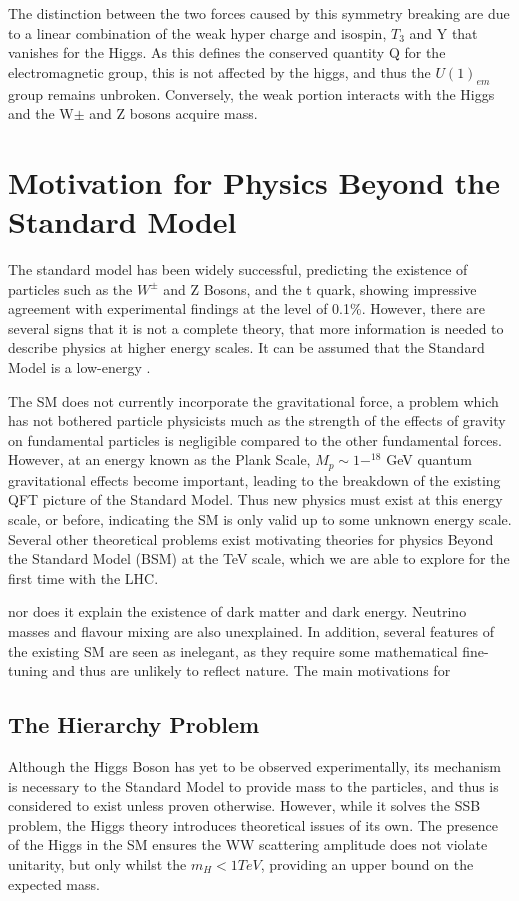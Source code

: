 The distinction between the two forces caused by this symmetry breaking are due to a linear combination of the weak hyper charge and isospin, $T_{3}$ and Y that vanishes for the Higgs. As this defines the conserved quantity Q for the electromagnetic group, this is not affected by the higgs, and thus the $U(1)_{em}$ group remains unbroken. Conversely, the weak portion interacts with the Higgs and the W$\pm$ and Z bosons acquire mass.  

\section{Motivation for Physics Beyond the Standard Model}
The standard model has been widely successful, predicting the existence of particles such as the $W^{\pm}$ and Z Bosons, and the t quark, showing impressive agreement with experimental findings at the level of 0.1\%. However, there are several signs that it is not a complete theory, that more information is needed to describe physics at higher energy scales. It can be assumed that the Standard Model is a low-energy . 

The SM does not currently incorporate the gravitational force, a problem which has not bothered particle physicists much as the strength of the effects of gravity on fundamental particles is negligible compared to the other fundamental forces. However, at an energy known as the Plank Scale, $M_{p} \sim 1-^{18}$ GeV quantum gravitational effects become important, leading to the breakdown of the existing QFT picture of the Standard Model. Thus new physics must exist at this energy scale, or before, indicating the SM is only valid up to some unknown energy scale. Several other theoretical problems exist motivating theories for physics Beyond the Standard Model (BSM) at the TeV scale, which we are able to explore for the first time with the LHC. 

 nor does it explain the existence of dark matter and dark energy. Neutrino masses and flavour mixing are also unexplained. In addition, several features of the existing SM are seen as inelegant, as they require some mathematical fine-tuning and thus are unlikely to reflect nature. The main motivations for 
\subsection{The Hierarchy Problem}

Although the Higgs Boson has yet to be observed experimentally, its mechanism is necessary to the Standard Model to provide mass to the particles, and thus is considered to exist unless proven otherwise. However, while it solves the SSB problem, the Higgs theory introduces theoretical issues of its own. The presence of the Higgs in the SM ensures the WW scattering amplitude does not violate unitarity, but only whilst the $m_{H} < 1 TeV$, providing an upper bound on the expected mass\cite{WWHMass}. 

